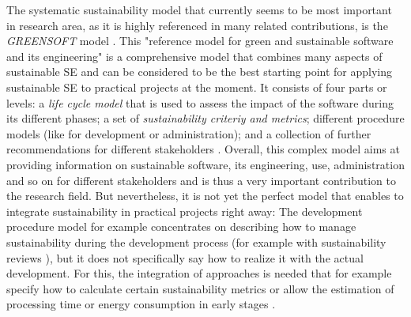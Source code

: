 \documentclass[oribibl]{llncs}
\begin{document}
The systematic sustainability model that currently seems to be most important %
in research area, as it is highly referenced in many related contributions, is the \textit{GREENSOFT} model \cite{naumann_greensoft_2011}. This "reference model for green and sustainable software and its engineering" \cite{naumann_greensoft_2011} is a comprehensive model that combines many aspects of sustainable SE %
and can be considered to be the best starting point for applying sustainable SE to practical projects at the moment. It consists of four parts or levels: a \textit{life cycle model} that is used to assess the impact of the software during its different phases; a set of \textit{sustainability criteriy and metrics}; different procedure models (like for development or administration); and a collection of further recommendations for different stakeholders \cite{naumann_greensoft_2011}.
Overall, this complex model aims at providing information on sustainable software, its engineering, use, administration and so on for different stakeholders and is thus a very important contribution to the research field. But nevertheless, it is not yet the perfect model that enables to integrate sustainability in practical projects right away: The development procedure model for example concentrates on describing how to manage sustainability %
during the development process (for example with sustainability reviews \cite{naumann_greensoft_2011}), but it does not specifically say how to realize it with the actual development. For this, the integration of approaches is needed that for example specify how to calculate certain sustainability metrics or allow the estimation of processing time or energy consumption in early stages \cite{naumann_greensoft_2011}. %
\end{document}

